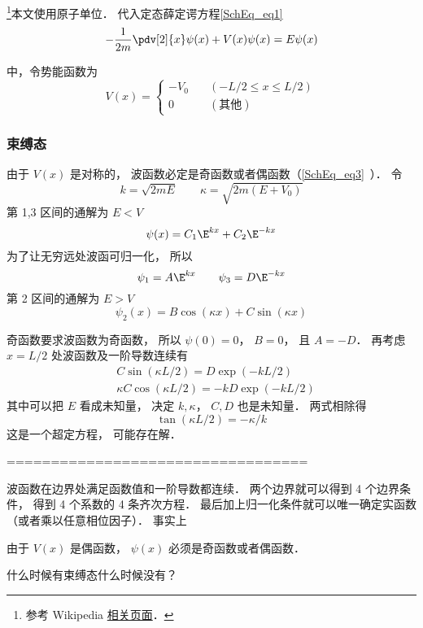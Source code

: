 




\footnote{参考 Wikipedia \href{https://en.wikipedia.org/wiki/Finite_potential_well}{相关页面}．}本文使用原子单位． 代入定态薛定谔方程\autoref{SchEq_eq1}~
\begin{equation}
-\frac{1}{2m}\pdv[2]{x}\psi(x) + V(x) \psi(x) = E \psi(x)
\end{equation}

中，令势能函数为
\begin{equation}
V(x) = \begin{cases}
-V_0 \quad &(-L/2 \leqslant x \leqslant L/2)\\
0 \quad &(\text{其他})
\end{cases}
\end{equation}

\subsubsection{束缚态}
由于 $V(x)$ 是对称的， 波函数必定是奇函数或者偶函数（\autoref{SchEq_eq3}~）． 令
\begin{equation}
k = \sqrt{2mE} \qquad \kappa = \sqrt{2m(E + V_0)}
\end{equation}
第 1,3 区间的通解为 $E < V$
\begin{equation}
\psi(x) = C_1 \E^{kx} + C_2 \E^{-kx}
\end{equation}
为了让无穷远处波函可归一化， 所以
\begin{equation}
\psi_1 = A \E^{kx} \qquad \psi_3 = D\E^{-kx}
\end{equation}
第 2 区间的通解为 $E > V$
\begin{equation}
\psi_2(x) = B \cos(\kappa x) + C\sin(\kappa x)
\end{equation}

奇函数要求波函数为奇函数， 所以 $\psi(0) = 0$， $B = 0$， 且 $A = -D$． 再考虑 $x = L/2$ 处波函数及一阶导数连续有
\begin{equation}
\begin{aligned}
&C\sin(\kappa L/2) = D \exp(-kL/2)\\
&\kappa C \cos(\kappa L/2) = -kD \exp(-kL/2)
\end{aligned}
\end{equation}
其中可以把 $E$ 看成未知量， 决定 $k, \kappa$， $C,D$ 也是未知量． 两式相除得
\begin{equation}
\tan(\kappa L/2) = -\kappa/k
\end{equation}
这是一个超定方程， 可能存在解．

==================================







波函数在边界处满足函数值和一阶导数都连续． 两个边界就可以得到 4 个边界条件， 得到 4 个系数的 4 条齐次方程． 最后加上归一化条件就可以唯一确定实函数（或者乘以任意相位因子）． 事实上


由于 $V(x)$ 是偶函数， $\psi(x)$ 必须是奇函数或者偶函数．




什么时候有束缚态什么时候没有？
